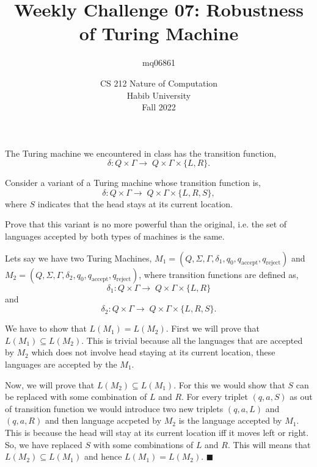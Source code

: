 \documentclass[a4paper]{exam}
\title{Weekly Challenge 07: Robustness of Turing Machine}
\author{mq06861} %
\date{CS 212 Nature of Computation\\Habib University\\Fall 2022}
\begin{document}
\maketitle

\begin{questions}


	The Turing machine we encountered in class has the transition function,
	\[
		\delta:Q\times\Gamma\to\; Q\times\Gamma\times\{L,R\}.
	\]

	Consider a variant of a Turing machine whose transition function is,
	\[
		\delta:Q\times\Gamma\to\; Q\times\Gamma\times\{L,R, S\},
	\]
	where $S$ indicates that the head stays at its current location.

	Prove that this variant is no more powerful than the original, i.e. the set of languages accepted by both types of machines is the same.

	\begin{solution}

		Lets say we have two Turing Machines, \(M_1=(Q,\Sigma,\Gamma,\delta_1,q_0,q_\text{accept},q_\text{reject})\) and \(M_2=(
		Q,\Sigma,\Gamma,\delta_2,q_0,q_\text{accept},q_\text{reject})\), where transition functions are defined as,
		\[
			\delta_1:Q\times\Gamma\to\; Q\times\Gamma\times\{L,R\}
		\]
		and
		\[
			\delta_2:Q\times\Gamma\to\; Q\times\Gamma\times\{L,R,S\}.
		\]
		
		We have to show that \(L(M_1)=L(M_2)\). First we will prove that \(L(M_1)\subseteq L(M_2)\). This is trivial because all the languages that are accepted by \(M_2\) which does not involve head staying at its current location, these languages are accepted by the \(M_1\).
		
		Now, we will prove that \(L(M_2)\subseteq L(M_1)\). For this we would show that \(S\) can be replaced with some combination of \(L\) and \(R\). For every triplet \((q,a,S)\) as out of transition function we would introduce two new triplets \((q,a,L)\) and \((q,a,R)\) and then language accpeted by \(M_2\) is the language accepted by \(M_1\). This is because the head will stay at its current location iff it moves left or right. So, we have replaced \(S\) with some combinations of \(L\) and \(R\). This will means that \(L(M_2)\subseteq L(M_1)\) and hence \(L(M_1)=L(M_2)\). \hfill\(\blacksquare\)
	\end{solution}
\end{questions}
\end{document}
